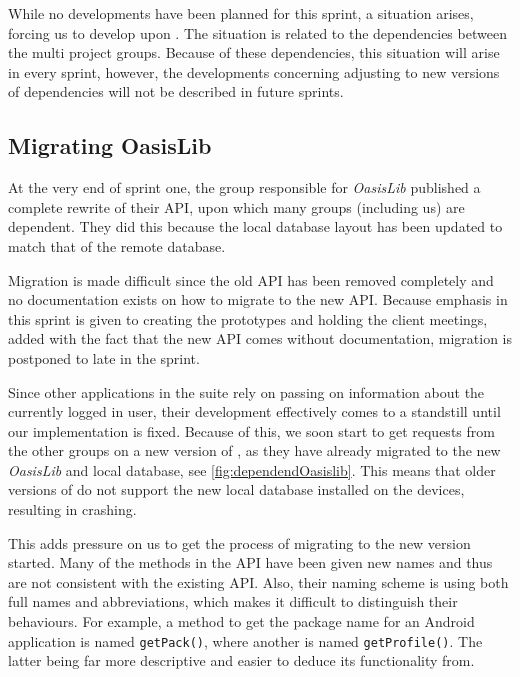 While no developments have been planned for this sprint, a situation arises, forcing us to develop upon \launcher.
The situation is related to the dependencies between the multi project groups.
Because of these dependencies, this situation will arise in every sprint, however, the developments concerning adjusting to new versions of dependencies will not be described in future sprints.

\subsection{Migrating OasisLib}\label{sec:oasismigration}
At the very end of sprint one, the group responsible for \textit{OasisLib} published a complete rewrite of their API, upon which many groups (including us) are dependent.
They did this because the local database layout has been updated to match that of the remote database.

Migration is made difficult since the old API has been removed completely and no documentation exists on how to migrate to the new API.
Because emphasis in this sprint is given to creating the prototypes and holding the client meetings, added with the fact that the new API comes without documentation, migration is postponed to late in the sprint.

Since other applications in the \giraf suite rely on \launcher passing on information about the currently logged in user, their development effectively comes to a standstill until our implementation is fixed.
Because of this, we soon start to get requests from the other groups on a new version of \launcher, as they have already migrated to the new \textit{OasisLib} and local database, see \cref{fig:dependendOasislib}.
This means that older versions of \launcher do not support the new local database installed on the devices, resulting in \launcher crashing.


This adds pressure on us to get the process of migrating to the new version started.
Many of the methods in the API have been given new names and thus are not consistent with the existing API.
Also, their naming scheme is using both full names and abbreviations, which makes it difficult to distinguish their behaviours.
For example, a method to get the package name for an Android application is named \lstinline{getPack()}, where another is named \lstinline{getProfile()}.
The latter being far more descriptive and easier to deduce its functionality from.


